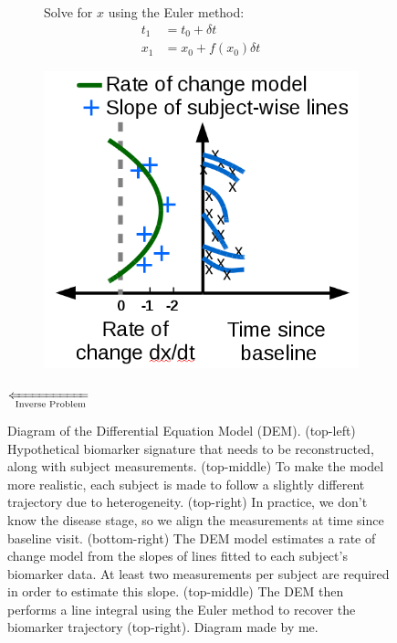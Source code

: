\begin{figure}[h]
\begin{subfigure}{0.3\textwidth}
  Solve for $x$ using the Euler method:
  \begin{align*}
  t_1 &= t_0 + \delta t \\
  x_1 &= x_0 + f(x_0) \delta t \label{eq:dem3}
  \end{align*}
 \end{subfigure}
 \begin{subfigure}{0.3\textwidth}
     \centering
     \includegraphics[width=\textwidth]{images/demNewFigs/fig4.png}
     \vspace{1em}
 \end{subfigure}
 \vspace{-2em}
 \par{\huge $\xLeftarrow[\text{Inverse Problem}]{}$}
 
 \caption[Diagram of the Differential Equation Model (DEM)]{Diagram of the Differential Equation Model (DEM). (top-left) Hypothetical biomarker signature that needs to be reconstructed, along with subject measurements. (top-middle) To make the model more realistic, each subject is made to follow a slightly different trajectory due to heterogeneity. (top-right) In practice, we don't know the disease stage, so we align the measurements at time since baseline visit. (bottom-right) The DEM model estimates a rate of change model from the slopes of lines fitted to each subject's biomarker data. At least two measurements per subject are required in order to estimate this slope. (top-middle) The DEM then performs a line integral using the Euler method to recover the biomarker trajectory (top-right).  Diagram made by me.}
\label{fig:bckDEM}
\end{figure}

